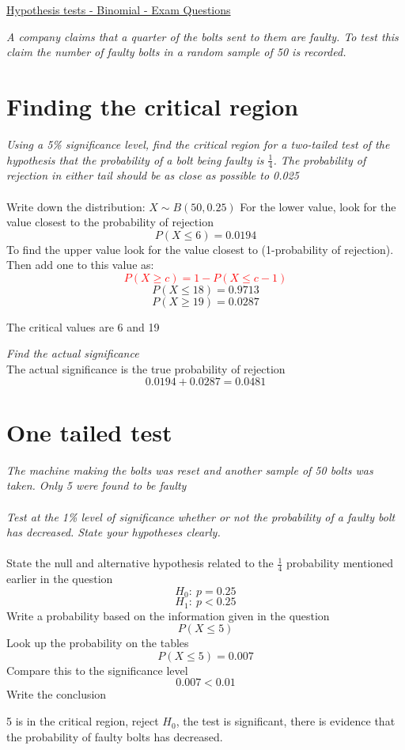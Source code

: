 \documentclass{article}[18pt]
\begin{document}
\begin{center}
\underline{\huge Hypothesis tests - Binomial - Exam Questions}
\end{center}
\textit{A company claims that a quarter of the bolts sent to them are faulty. To test this claim the
number of faulty bolts in a random sample of 50 is recorded.}
\section{Finding the critical region}
\textit{Using a 5\% significance level, find the critical region for a two-tailed test of the
hypothesis that the probability of a bolt being faulty is $\frac{1}{4}$. The probability of rejection in
either tail should be as close as possible to 0.025}\\
\\
Write down the distribution:
$X\sim B(50,0.25)$
For the lower value, look for the value closest to the probability of rejection
$$P(X\leqslant6)=0.0194$$
To find the upper value look for the value closest to (1-probability of rejection). Then add one to this value as:
\textcolor{red}{$$P(X\geqslant c)=1-P(X\leqslant c-1)$$}
$$P(X\leqslant18)=0.9713$$
$$P(X\geqslant19)=0.0287$$
\begin{center}
The critical values are 6 and 19
\end{center}
\textit{Find the actual significance}\\
The actual significance is the true probability of rejection
$$0.0194+0.0287=0.0481$$
\section{One tailed test}
\textit{The machine making the bolts was reset and another sample of 50 bolts was taken. Only 5 were
found to be faulty}\\
\\
\textit{Test at the 1\% level of significance whether or not the probability of a faulty bolt has
decreased. State your hypotheses clearly.}\\
\\
State the null and alternative hypothesis related to the $\frac{1}{4}$ probability mentioned earlier in the question
$$H_0: \ p=0.25$$
$$H_1: \ p<0.25$$
Write a probability based on the information given in the question
$$P(X\leqslant5)$$
Look up the probability on the tables
$$P(X\leqslant5)=0.007$$
Compare this to the significance level
$$0.007<0.01$$
Write the conclusion
\begin{center}
5 is in the critical region, reject $H_0$, the test is significant, there is evidence that the probability of faulty bolts has decreased.
\end{center}
\newpage
\end{document}
